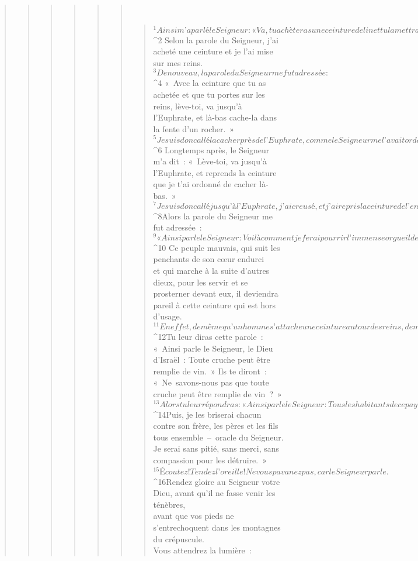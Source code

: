\begin{verse}
\begin{verse}
\begin{verse}
\begin{verse}
\begin{verse}
\begin{verse}
         
      \bchapter{}
      \begin{verse}
${}^{1}Ainsi m’a parlé le Seigneur : « Va, tu achèteras une ceinture de lin et tu la mettras sur tes reins. Évite de la tremper dans l’eau. » 
${}^{2} Selon la parole du Seigneur, j’ai acheté une ceinture et je l’ai mise sur mes reins. 
${}^{3} De nouveau, la parole du Seigneur me fut adressée : 
${}^{4} « Avec la ceinture que tu as achetée et que tu portes sur les reins, lève-toi, va jusqu’à l’Euphrate, et là-bas cache-la dans la fente d’un rocher. » 
${}^{5} Je suis donc allé la cacher près de l’Euphrate, comme le Seigneur me l’avait ordonné. 
${}^{6} Longtemps après, le Seigneur m’a dit : « Lève-toi, va jusqu’à l’Euphrate, et reprends la ceinture que je t’ai ordonné de cacher là-bas. » 
${}^{7} Je suis donc allé jusqu’à l’Euphrate, j’ai creusé, et j’ai repris la ceinture de l’endroit où je l’avais cachée. Et voici : la ceinture était pourrie, hors d’usage !
${}^{8}Alors la parole du Seigneur me fut adressée : 
${}^{9} « Ainsi parle le Seigneur : Voilà comment je ferai pourrir l’immense orgueil de Juda et de Jérusalem. 
${}^{10} Ce peuple mauvais, qui suit les penchants de son cœur endurci\\et qui marche à la suite d’autres dieux, pour les servir et se prosterner devant eux, il deviendra pareil à cette ceinture qui est hors d’usage. 
${}^{11} En effet, de même qu’un homme s’attache une ceinture autour des reins, de même je m’étais attaché toute la maison d’Israël et toute la maison de Juda – oracle du Seigneur, pour qu’elles soient mon peuple, mon renom, ma louange et ma parure. Mais elles n’ont pas écouté ! »
${}^{12}Tu leur diras cette parole : « Ainsi parle le Seigneur, le Dieu d’Israël : Toute cruche peut être remplie de vin. » Ils te diront : « Ne savons-nous pas que toute cruche peut être remplie de vin ? » 
${}^{13}Alors tu leur répondras : « Ainsi parle le Seigneur : Tous les habitants de ce pays, les rois qui siègent sur le trône de David, les prêtres, les prophètes et les habitants de Jérusalem, je vais les remplir d’ivresse. 
${}^{14}Puis, je les briserai chacun contre son frère, les pères et les fils tous ensemble – oracle du Seigneur. Je serai sans pitié, sans merci, sans compassion pour les détruire. »
${}^{15}Écoutez ! Tendez l’oreille ! Ne vous pavanez pas,
        car le Seigneur parle.
${}^{16}Rendez gloire au Seigneur votre Dieu,
        avant qu’il ne fasse venir les ténèbres,
        \\avant que vos pieds ne s’entrechoquent
        dans les montagnes du crépuscule.
        \\Vous attendrez la lumière :

\end{verse}
\end{verse}
\end{verse}
\end{verse}
\end{verse}
\end{verse}
\end{verse}
